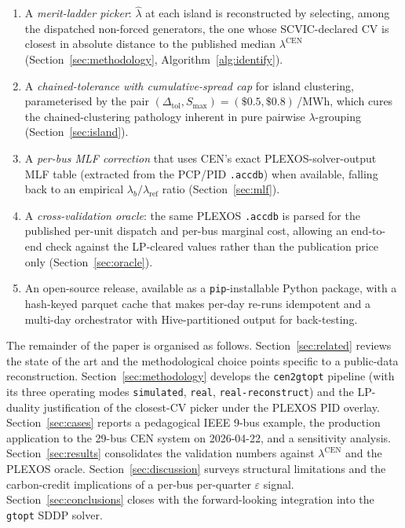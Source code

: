 \begin{enumerate}
\item A \emph{merit-ladder picker}: $\hat\lambda$ at each island is
  reconstructed by selecting, among the dispatched non-forced
  generators, the one whose SCVIC-declared CV is closest in
  absolute distance to the published median $\lambda^{\mathrm{CEN}}$
  (Section~\ref{sec:methodology}, Algorithm~\ref{alg:identify}).
\item A \emph{chained-tolerance with cumulative-spread cap} for
  island clustering, parameterised by the pair
  $(\Delta_{\mathrm{tol}}, S_{\max}) = (\$0.5, \$0.8)$\,/MWh, which
  cures the chained-clustering pathology inherent in pure pairwise
  $\lambda$-grouping (Section~\ref{sec:island}).
\item A \emph{per-bus MLF correction} that uses CEN's exact
  PLEXOS-solver-output MLF table (extracted from the PCP/PID
  \texttt{.accdb}) when available, falling back to an empirical
  $\lambda_b/\lambda_{\mathrm{ref}}$ ratio
  (Section~\ref{sec:mlf}).
\item A \emph{cross-validation oracle}: the same PLEXOS
  \texttt{.accdb} is parsed for the published per-unit dispatch
  and per-bus marginal cost, allowing an end-to-end check against
  the LP-cleared values rather than the publication price only
  (Section~\ref{sec:oracle}).
\item An open-source release, available as a
  \texttt{pip}-installable Python package, with a hash-keyed parquet
  cache that makes per-day re-runs idempotent and a multi-day
  orchestrator with Hive-partitioned output for back-testing.
\end{enumerate}

The remainder of the paper is organised as follows.
Section~\ref{sec:related} reviews the state of the art and the
methodological choice points specific to a public-data
reconstruction.  Section~\ref{sec:methodology} develops the
\texttt{cen2gtopt} pipeline (with its three operating modes
\texttt{simulated}, \texttt{real}, \texttt{real-reconstruct}) and
the LP-duality justification of the closest-CV picker under the
PLEXOS PID overlay.  Section~\ref{sec:cases} reports a pedagogical
IEEE 9-bus example, the production application to the
\num{29}-bus CEN system on 2026-04-22, and a sensitivity analysis.
Section~\ref{sec:results} consolidates the validation numbers
against $\lambda^{\mathrm{CEN}}$ and the PLEXOS oracle.
Section~\ref{sec:discussion} surveys structural limitations and
the carbon-credit implications of a per-bus per-quarter
$\varepsilon$ signal.  Section~\ref{sec:conclusions} closes with the
forward-looking integration into the \texttt{gtopt} SDDP solver.
